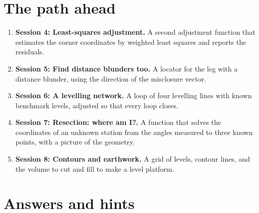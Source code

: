 \documentclass[11pt,a4paper]{article}
\begin{document}
\section{The path ahead}
\begin{enumerate}[nosep]
\item \textbf{Session 4: Least-squares adjustment.} A second adjustment function that estimates the corner coordinates by weighted least squares and reports the residuals.
\item \textbf{Session 5: Find distance blunders too.} A locator for the leg with a distance blunder, using the direction of the misclosure vector.
\item \textbf{Session 6: A levelling network.} A loop of four levelling lines with known benchmark levels, adjusted so that every loop closes.
\item \textbf{Session 7: Resection: where am I?.} A function that solves the coordinates of an unknown station from the angles measured to three known points, with a picture of the geometry.
\item \textbf{Session 8: Contours and earthwork.} A grid of levels, contour lines, and the volume to cut and fill to make a level platform.
\end{enumerate}

\section{Answers and hints}
\end{document}
